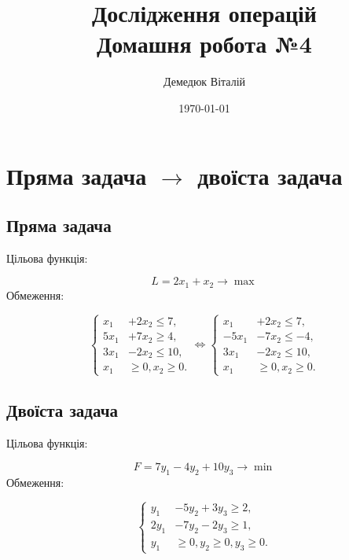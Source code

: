 \documentclass[a4paper, 12pt]{article}
\author{Демедюк Віталій}
\title{Дослідження операцій\\
	   Домашня робота №4}
\date{\today}
\begin{document}
\maketitle
\newpage

\tableofcontents


\newpage

\section{Пряма задача $\rightarrow$ двоїста задача}

\subsection{Пряма задача}

Цільова функція:

\begin{equation*}
L = 2x_1 + x_2 \rightarrow \max
\end{equation*}
Обмеження:

\begin{equation*}
\left\{
\begin{aligned}
	x_1 &+ 2x_2 \leq 7,\\
	5x_1 &+ 7x_2 \geq 4,\\
	3x_1 &- 2x_2 \leq 10,\\
	x_1 &\geq 0, x_2 \geq 0. 
\end{aligned}
\right.
\Longleftrightarrow
\left\{
\begin{aligned}
	x_1 &+ 2x_2 \leq 7,\\
	-5x_1 &- 7x_2 \leq -4,\\
	3x_1 &- 2x_2 \leq 10,\\
	x_1 &\geq 0, x_2 \geq 0. 
\end{aligned}
\right.
\end{equation*}

\subsection{Двоїста задача}

Цільова функція:

\begin{equation*}
F = 7y_1 - 4y_2 + 10y_3 \rightarrow \min
\end{equation*}
Обмеження:

\begin{equation*}
\left\{
\begin{aligned}
	y_1 &- 5y_2 + 3y_3 \geq 2,\\
	2y_1 &- 7y_2 - 2y_3 \geq 1,\\
	y_1 &\geq 0, y_2 \geq 0, y_3 \geq 0. 
\end{aligned}
\right.
\end{equation*}
\end{document}
